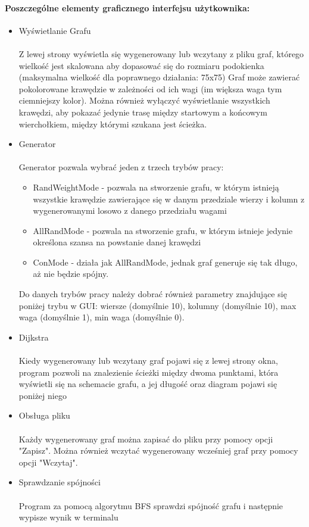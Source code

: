 \documentclass{article}
\begin{document}
\paragraph{Poszczególne elementy graficznego interfejsu użytkownika:}
\begin{itemize}
\item Wyświetlanie Grafu\\\\
Z lewej strony wyświetla się wygenerowany lub wczytany z pliku graf, którego wielkość jest skalowana aby dopasować się do rozmiaru podokienka (maksymalna wielkość dla poprawnego działania: 75x75) Graf może zawierać pokolorowane krawędzie w zależności od ich wagi (im większa waga tym ciemniejszy kolor). Można również wyłączyć wyświetlanie wszystkich krawędzi, aby pokazać jedynie trasę między startowym a końcowym wierchołkiem, między którymi szukana jest ścieżka.\\
\item Generator\\\\
Generator pozwala wybrać jeden z trzech trybów pracy:
\begin{itemize}
    \item RandWeightMode - pozwala na stworzenie grafu, w którym istnieją wszystkie krawędzie zawierające się w danym przedziale wierzy i kolumn z wygenerowanymi losowo z danego przedziału wagami
    \item AllRandMode - pozwala na stworzenie grafu, w którym istnieje jedynie określona szansa na powstanie danej krawędzi
    \item ConMode - działa jak AllRandMode, jednak graf generuje się tak długo, aż nie będzie spójny.
\end{itemize}
Do danych trybów pracy należy dobrać również parametry znajdujące się poniżej trybu w GUI: wiersze (domyślnie 10), kolumny (domyślnie 10), max waga (domyślnie 1), min waga (domyślnie 0).\\

\item Dijkstra\\\\
Kiedy wygenerowany lub wczytany graf pojawi się z lewej strony okna, program pozwoli na znalezienie ścieżki między dwoma punktami, która wyświetli się na schemacie grafu, a jej długość oraz diagram pojawi się poniżej niego\\

\item Obsługa pliku\\\\
Każdy wygenerowany graf można zapisać do pliku przy pomocy opcji "Zapisz". Można również wczytać wygenerowany wcześniej graf przy pomocy opcji "Wczytaj".
\item Sprawdzanie spójności\\\\
Program za pomocą algorytmu BFS sprawdzi spójność grafu i  następnie wypisze wynik w terminalu
\end{itemize}
\end{document}
